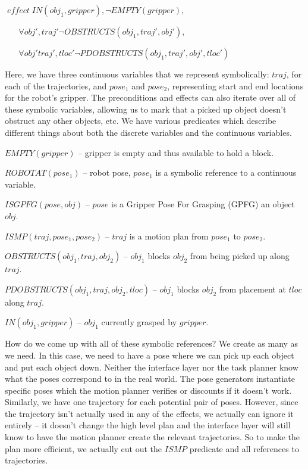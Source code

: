 \documentclass[12pt]{article}
\begin{document}
$\; effect \; IN(obj_1, gripper), \neg EMPTY(gripper), $

$\; \; \;\; \; \; \forall obj', traj' \neg OBSTRUCTS(obj_1, traj', obj'), $

$\; \; \; \; \; \;\forall obj' traj', tloc' \neg PDOBSTRUCTS(obj_1, traj', obj', tloc')$

\vspace{10pt}

Here, we have three continuous variables that we represent symbolically: $traj$, for each of the trajectories, and $pose_1$ and $pose_2$, representing start and end locations for the robot's gripper.
The preconditions and effects can also iterate over all of these symbolic variables, allowing us to mark that a picked up object doesn't obstruct any other objects, etc. 
We have various predicates which describe different things about both the discrete variables and the continuous variables.

\vspace{10pt}

$EMPTY(gripper)$ -- gripper is empty and thus available to hold a block.

$ROBOTAT(pose_1)$ -- robot pose,  $pose_1$ is a symbolic reference to a continuous variable.

$ISGPFG(pose, obj)$ -- $pose$ is a Gripper Pose For Grasping (GPFG) an object $obj$.

$ISMP(traj, pose_1, pose_2)$ -- $traj$ is a motion plan from $pose_1$ to $pose_2$.

$OBSTRUCTS(obj_1, traj, obj_2)$ -- $obj_1$ blocks $obj_2$ from being picked up along $traj$.

$PDOBSTRUCTS(obj_1, traj, obj_2, tloc)$ -- $obj_1$ blocks $obj_2$ from placement at $tloc$ along $traj$.

$IN(obj_1, gripper)$ -- $obj_1$ currently grasped by $gripper$.

\vspace{10pt}

How do we come up with all of these symbolic references?  
We create as many as we need.  
In this case, we need to have a pose where we can pick up each object and put each object down.  
Neither the interface layer nor the task planner know what the poses correspond to in the real world.
The pose generators instantiate specific poses which the motion planner verifies or discounts if it doesn't work.
Similarly, we have one trajectory for each potential pair of poses.  
However, since the trajectory isn't actually used in any of the effects, we actually can ignore it entirely -- it doesn't change the high level plan and the interface layer will still know to have the motion planner create the relevant trajectories. 
So to make the plan more efficient, we actually cut out the $ISMP$ predicate and all references to trajectories.
\end{document}
